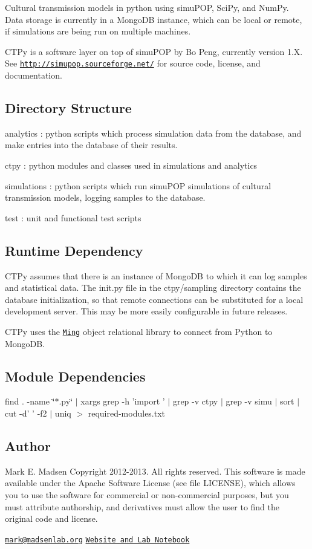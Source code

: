 Cultural transmission models in python using simu\-P\-O\-P, Sci\-Py, and Num\-Py. Data storage is currently in a Mongo\-D\-B instance, which can be local or remote, if simulations are being run on multiple machines.

C\-T\-Py is a software layer on top of simu\-P\-O\-P by Bo Peng, currently version 1.\-X. See \href{http://simupop.sourceforge.net/}{\tt http\-://simupop.\-sourceforge.\-net/} for source code, license, and documentation.

\subsection*{Directory Structure}

analytics \-: python scripts which process simulation data from the database, and make entries into the database of their results.

ctpy \-: python modules and classes used in simulations and analytics

simulations \-: python scripts which run simu\-P\-O\-P simulations of cultural transmission models, logging samples to the database.

test \-: unit and functional test scripts

\subsection*{Runtime Dependency}

C\-T\-Py assumes that there is an instance of Mongo\-D\-B to which it can log samples and statistical data. The init.\-py file in the ctpy/sampling directory contains the database initialization, so that remote connections can be substituted for a local development server. This may be more easily configurable in future releases.

C\-T\-Py uses the \href{http://merciless.sourceforge.net/index.html}{\tt Ming} object relational library to connect from Python to Mongo\-D\-B.

\subsection*{Module Dependencies}

find . -\/name \char`\"{}$\ast$.\-py\char`\"{} $|$ xargs grep -\/h 'import ' $|$ grep -\/v ctpy $|$ grep -\/v simu $|$ sort $|$ cut -\/d' ' -\/f2 $|$ uniq $>$ required-\/modules.\-txt

\subsection*{Author}

Mark E. Madsen Copyright 2012-\/2013. All rights reserved. This software is made available under the Apache Software License (see file L\-I\-C\-E\-N\-S\-E), which allows you to use the software for commercial or non-\/commercial purposes, but you must attribute authorship, and derivatives must allow the user to find the original code and license.

\href{mailto:mark@madsenlab.org}{\tt mark@madsenlab.\-org} \href{http://notebook.madsenlab.org}{\tt Website and Lab Notebook} 